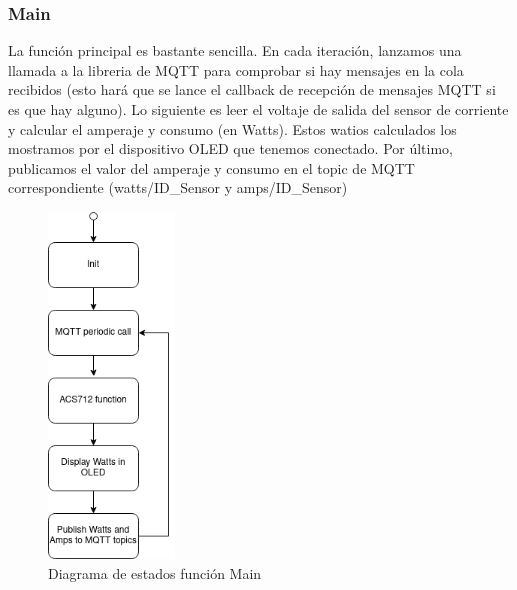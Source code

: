 \begin{titlepage}
\subsubsection{Main}
La función principal es bastante sencilla. En cada iteración, lanzamos una llamada a la libreria de MQTT para comprobar si hay mensajes en la cola recibidos (esto hará que se lance el callback de recepción de mensajes MQTT si es que hay alguno). Lo siguiente es leer el voltaje de salida del sensor de corriente y calcular el amperaje y consumo (en Watts). Estos watios calculados los mostramos por el dispositivo OLED que tenemos conectado. Por último, publicamos el valor del amperaje y consumo en el topic de MQTT correspondiente (watts/ID\_Sensor y amps/ID\_Sensor)

\begin{figure}[h!]
	\centering
	\includegraphics[width=0.30\textwidth]{imagenes/main.drawio.png}
	\caption{Diagrama de estados función Main}
\end{figure}
\newpage

\end{titlepage}
